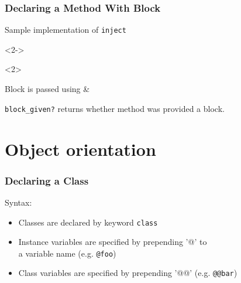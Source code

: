 \documentclass{beamer}
\begin{document}
\begin{frame}[t,fragile]
  \frametitle{Declaring a Method With Block}
  \begin{block}{Sample implementation of \texttt{inject}}
    \begin{semiverbatim}
    \end{semiverbatim}
  \end{block}

  \begin{onlyenv}<2->
    \begin{itemize}
      \begin{onlyenv}<2>
	\item Block is passed using \&
	\item \texttt{block\_given?} returns whether method was provided a block.
      \end{onlyenv}
    \end{itemize}
  \end{onlyenv}
\end{frame}

\section{Object orientation}
\begin{frame}
  \frametitle{Declaring a Class}
  \begin{block}{Syntax:}
  \begin{itemize}
    \item Classes are declared by keyword \texttt{class}
    \item Instance variables are specified by prepending '@' to \\ a variable name (e.g. \texttt{@foo})
    \item Class variables are specified by prepending '@@' (e.g. \texttt{@@bar})
  \end{itemize}
  \end{block}
\end{frame}
\end{document}
